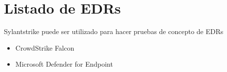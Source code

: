 \section{Listado de EDRs}

Sylantstrike puede ser utilizado para hacer pruebas de concepto de EDRs

\begin{itemize}
    \item CrowdStrike Falcon
    \item Microsoft Defender for Endpoint
\end{itemize}